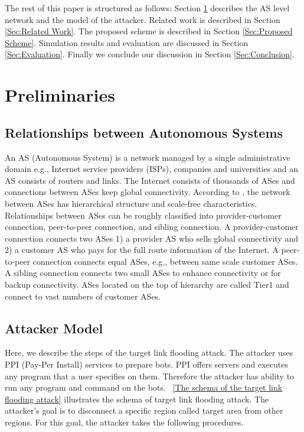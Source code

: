 \documentclass[conference]{IEEEtran}
\begin{document}
    The rest of this paper is structured as follows: Section \ref{Sec:Preliminaries} describes the AS level network and the model of the attacker.
    Related work is described in Section \ref{Sec:Related Work}.
    The proposed scheme is described in Section \ref{Sec:Proposed Scheme}.
    Simulation results and evaluation are discussed in Section \ref{Sec:Evaluation}.
    Finally we conclude our discussion in Section \ref{Sec:Conclusion}.

  \section{Preliminaries}\label{Sec:Preliminaries}
  \subsection{Relationships between Autonomous Systems}\label{Sec:Relationships between Autonomous Systems}
    An AS (Autonomous System) is a network managed by a single administrative domain e.g., Internet service providers (ISPs), companies and universities and an AS consists of routers and links.
    The Internet consists of thousands of ASes and connections between ASes keep global connectivity.
    According to \cite{as-relation, AS1, AS2}, the network between ASes has hierarchical structure and scale-free characteristics.
    Relationships between ASes can be roughly classified into provider-customer connection, peer-to-peer connection, and sibling connection.
    A provider-customer connection connects two ASes 1) a provider AS who sells global connectivity and 2) a customer AS who pays for the full route information of the Internet.
    A peer-to-peer connection connects equal ASes, e.g., between same scale customer ASes.
    A sibling connection connects two small ASes to enhance connectivity or for backup connectivity.
    ASes located on the top of hierarchy are called Tier1 and connect to vast numbers of customer ASes.

  \subsection{Attacker Model}\label{Sec:Attacker Model}
    Here, we describe the steps of the target link flooding attack.
    The attacker uses PPI (Pay-Per Install) services to prepare bots.
    PPI offers servers and executes any program that a user specifies on them.
    Therefore the attacker has ability to run any program and command on the bots.
    \figurename~\ref{The schema of the target link flooding attack} illustrates the schema of target link flooding attack.
    The attacker's goal is to disconnect a specific region called target area from other regions.
    For this goal, the attacker takes the following procedures.
\end{document}
